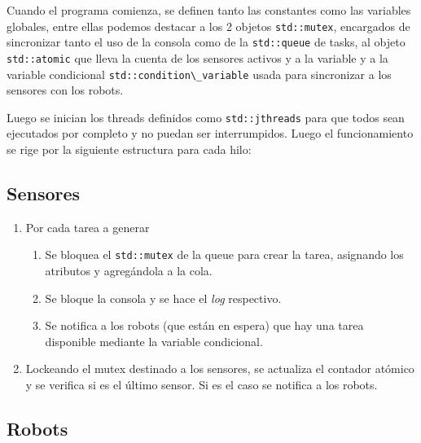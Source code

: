 \documentclass[11pt, a4paper]{article}
\begin{document}
\begin{multicols}{2}
Cuando el programa comienza, se definen tanto las constantes como las variables
globales, entre ellas podemos destacar a los 2 objetos \lstinline|std::mutex|, encargados
de sincronizar tanto el uso de la consola como de la \lstinline|std::queue| de tasks,
al objeto \lstinline|std::atomic| que lleva la cuenta de los sensores activos y a la variable
y a la variable condicional \lstinline|std::condition\_variable| usada para sincronizar a
los sensores con los robots.

Luego se inician los threads definidos como \lstinline|std::jthreads| para que todos sean
ejecutados por completo y no puedan ser interrumpidos. Luego el funcionamiento se rige por 
la siguiente estructura para cada hilo:

\subsection{Sensores}

\begin{enumerate}[label=\Roman*.]
    \item Por cada tarea a generar 
    \begin{enumerate}[label=\roman*.]
        \item Se bloquea el \lstinline|std::mutex| de la queue para crear la tarea,
        asignando los atributos y agregándola a la cola.
        \item Se bloque la consola y se hace el \textit{log} respectivo.
        \item Se notifica a los robots (que están en espera) que hay una tarea disponible
        mediante la variable condicional.
    \end{enumerate}
    \item Lockeando el mutex destinado a los sensores, se actualiza el contador atómico y se 
    verifica si es el último sensor. Si es el caso se notifica a los robots.
\end{enumerate}

\subsection{Robots}


\end{multicols}
\end{document}
